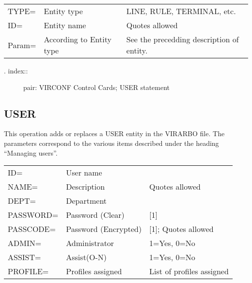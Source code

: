 \documentclass[letterpaper,10pt,english]{sphinxmanual}
\begin{document}
\begin{savenotes}\sphinxattablestart
\centering
\begin{tabulary}{\linewidth}[t]{|T|T|T|}
\hline
{}\relax &\relax &\relax \\
\hline
TYPE=
&
Entity type
&
LINE, RULE, TERMINAL, etc.
\\
\hline
ID=
&
Entity name
&
Quotes allowed
\\
\hline
Param=
&
According to Entity type
&
See the precedding description of entity.
\\
\hline
\end{tabulary}
\par
\sphinxattableend\end{savenotes}
\begin{description}
\item[{. index::}] \leavevmode
pair: VIRCONF Control Cards; USER statement

\end{description}


\subsection{USER}
\label{\detokenize{Installation_Guide:user}}
This operation adds or replaces a USER entity in the VIRARBO file. The parameters correspond to the various items described under the heading “Managing users”.


\begin{savenotes}\sphinxattablestart
\centering
\begin{tabulary}{\linewidth}[t]{|T|T|T|}
\hline
{}\relax &\relax &\relax \\
\hline
ID=
&
User name
&\\
\hline
NAME=
&
Description
&
Quotes allowed
\\
\hline
DEPT=
&
Department
&\\
\hline
PASSWORD=
&
Password (Clear)
&
{[}1{]}
\\
\hline
PASSCODE=
&
Password (Encrypted)
&
{[}1{]}; Quotes allowed
\\
\hline
ADMIN=
&
Administrator
&
1=Yes, 0=No
\\
\hline
ASSIST=
&
Assist(O-N)
&
1=Yes, 0=No
\\
\hline
PROFILE=
&
Profiles assigned
&
List of profiles assigned
\\
\hline
\end{tabulary}
\par
\sphinxattableend\end{savenotes}
\end{document}
